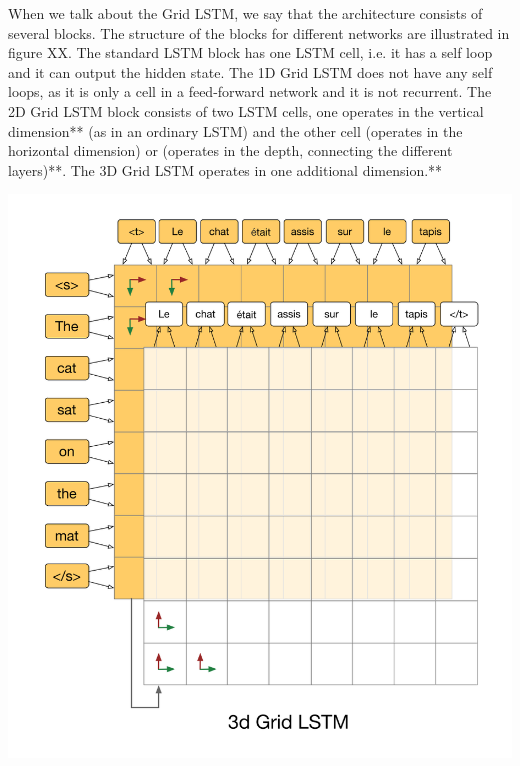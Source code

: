 \documentclass{article} %
\begin{document}
 When we talk about the Grid LSTM, we say that the architecture consists of several blocks. The structure of the blocks for different networks are illustrated in figure XX. The standard LSTM block has one LSTM cell, i.e. it has a self loop and it can output the hidden state. The 1D Grid LSTM does not have any self loops, as it is only a cell in a feed-forward network and it is not recurrent. The 2D Grid LSTM block consists of two LSTM cells, one operates in the vertical dimension** (as in an ordinary LSTM) and the other cell (operates in the horizontal dimension) or (operates in the depth, connecting the different layers)**. The 3D Grid LSTM operates in one additional dimension.** 


\includegraphics[scale=0.5]{3dgridlstm} \newline
\end{document}
